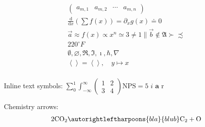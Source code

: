 \documentclass[11pt, oneside]{article}   	%
\begin{document}
\begin{eqnarray}
\begin{pmatrix}
  a_{m,1} & a_{m,2} & \cdots & a_{m,n}
 \end{pmatrix} \\
\frac{\mathrm{d}}{\mathrm{d}x}\left(\sum f(x)\right) = \partial_x g(x) \doteq 0 \\
\vec{a} \approx f(x) \propto x^n \simeq 3 \neq 1 \parallel \vec{b} \notin \mathfrak{A} \succ \precsim \\
220^\circ F \\
\emptyset, \varnothing, \Re, \Im, \imath, \hbar, \nabla \\
\left\langle \right\rangle = \left< \right>, \quad y \mapsto x \\
\end{eqnarray}

Inline text symbols: $ \sum_0^1 \int_{-\infty}^\infty
\left(\begin{smallmatrix} 1 & 2\\3 & 4 \end{smallmatrix}\right) \text{NPS} = 5 \textit{ i } \textbf{a } \textrm{r }$

Chemistry arrows:
\begin{eqnarray}
2\text{CO}_2\autorightleftharpoons{bla}{blub} \text{C}_2 + \text{O}\\
\end{eqnarray}
\end{document}

